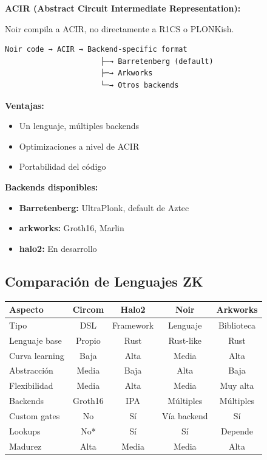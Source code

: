 \documentclass[11pt,a4paper,twoside,openright]{book}
\theoremstyle{definition}
\theoremstyle{plain}
\theoremstyle{remark}
\begin{document}
\begin{keyidea}
\textbf{ACIR (Abstract Circuit Intermediate Representation):}

Noir compila a ACIR, no directamente a R1CS o PLONKish.

\begin{verbatim}
Noir code → ACIR → Backend-specific format
                      ├─→ Barretenberg (default)
                      ├─→ Arkworks
                      └─→ Otros backends
\end{verbatim}

\textbf{Ventajas:}
\begin{itemize}
    \item Un lenguaje, múltiples backends
    \item Optimizaciones a nivel de ACIR
    \item Portabilidad del código
\end{itemize}

\textbf{Backends disponibles:}
\begin{itemize}
    \item \textbf{Barretenberg:} UltraPlonk, default de Aztec
    \item \textbf{arkworks:} Groth16, Marlin
    \item \textbf{halo2:} En desarrollo
\end{itemize}
\end{keyidea}

\subsection{Comparación de Lenguajes ZK}

\begin{center}
\begin{tabular}{lcccc}
\toprule
\textbf{Aspecto} & \textbf{Circom} & \textbf{Halo2} & \textbf{Noir} & \textbf{Arkworks} \\
\midrule
Tipo & DSL & Framework & Lenguaje & Biblioteca \\
Lenguaje base & Propio & Rust & Rust-like & Rust \\
Curva learning & Baja & Alta & Media & Alta \\
Abstracción & Media & Baja & Alta & Baja \\
Flexibilidad & Media & Alta & Media & Muy alta \\
Backends & Groth16 & IPA & Múltiples & Múltiples \\
Custom gates & No & Sí & Vía backend & Sí \\
Lookups & No* & Sí & Sí & Depende \\
Madurez & Alta & Media & Media & Alta \\
\bottomrule
\end{tabular}
\end{center}
\end{document}
